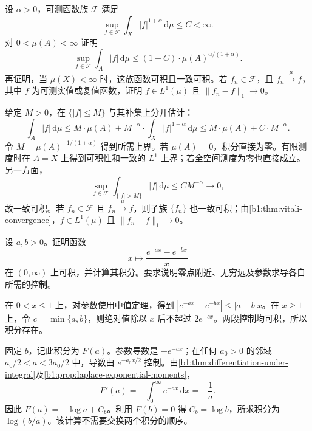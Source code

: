 \begin{exercise}\label{b1:ex:0505}
设 \(\alpha>0\)，可测函数族 \(\mathcal F\) 满足
\[
\sup_{f\in\mathcal F}\int_X|f|^{1+\alpha}\,\mathrm d\mu\leq C<\infty.
\]
对 \(0<\mu(A)<\infty\) 证明
\[
\sup_{f\in\mathcal F}\int_A|f|\,\mathrm d\mu
\leq(1+C)\cdot\mu(A)^{\alpha/(1+\alpha)}.
\]
再证明，当 \(\mu(X)<\infty\) 时，这族函数可积且一致可积。若 \(f_n\in\mathcal F\)，且 \(f_n\xrightarrow{\mu}f\)，其中 \(f\) 为可测实值或复值函数，证明 \(f\in L^1(\mu)\) 且 \(\|f_n-f\|_1\to0\)。
\end{exercise}
\begin{solution}
给定 \(M>0\)，在 \(\{|f|\leq M\}\) 与其补集上分开估计：
\[
\int_A|f|\,\mathrm d\mu
\leq M\cdot\mu(A)+M^{-\alpha}\cdot\int_X|f|^{1+\alpha}\,\mathrm d\mu
\leq M\cdot\mu(A)+C\cdot M^{-\alpha}.
\]
令 \(M=\mu(A)^{-1/(1+\alpha)}\) 得到所需上界。若 \(\mu(A)=0\)，积分直接为零。有限测度时在 \(A=X\) 上得到可积性和一致的 \(L^1\) 上界；若全空间测度为零也直接成立。另一方面，
\[
\sup_{f\in\mathcal F}\int_{\{|f|>M\}}|f|\,\mathrm d\mu\leq CM^{-\alpha}\longrightarrow0,
\]
故一致可积。若 \(f_n\in\mathcal F\) 且 \(f_n\xrightarrow{\mu}f\)，则子族 \(\{f_n\}\) 也一致可积；由\cref{b1:thm:vitali-convergence}，\(f\in L^1(\mu)\) 且 \(\|f_n-f\|_1\to0\)。
\end{solution}

\begin{exercise}\label{b1:ex:0506}
设 \(a,b>0\)。证明函数
\[
x\longmapsto\frac{e^{-ax}-e^{-bx}}{x}
\]
在 \((0,\infty)\) 上可积，并计算其积分。要求说明零点附近、无穷远及参数求导各自所需的控制。
\end{exercise}
\begin{solution}
在 \(0<x\leq1\) 上，对参数使用中值定理，得到
\(|e^{-ax}-e^{-bx}|\leq|a-b|x\)。在 \(x\geq1\) 上，令 \(c=\min\{a,b\}\)，则绝对值除以 \(x\) 后不超过 \(2e^{-cx}\)。两段控制均可积，所以积分存在。

固定 \(b\)，记此积分为 \(F(a)\)。参数导数是 \(-e^{-ax}\)；在任何 \(a_0>0\) 的邻域 \(a_0/2<a<3a_0/2\) 中，导数由 \(e^{-a_0x/2}\) 控制。由\cref{b1:thm:differentiation-under-integral}及\cref{b1:prop:laplace-exponential-moments}，
\[
F'(a)=-\int_0^\infty e^{-ax}\,\mathrm dx=-\frac1a.
\]
因此 \(F(a)=-\log a+C_b\)。利用 \(F(b)=0\) 得 \(C_b=\log b\)，所求积分为 \(\log(b/a)\)。该计算不需要交换两个积分的顺序。
\end{solution}

